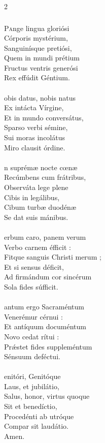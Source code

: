 \documentclass[9pt,twoside]{extarticle}
\begin{document}
\begin{multicols}{2}
{\subsubsection*{\center{}}
\lettrine{P}ange lingua gloriósi\\
Córporis mystérium,\\
Sanguinísque pretiósi,\\
Quem in mundi prétium\\
Fructus ventris generósi\\
Rex effúdit Géntium.\\
\\
obis datus, nobis natus\\
Ex intácta Vírgine,\\
Et in mundo conversátus,\\
Sparso verbi sémine,\\
Sui moras incolátus\\
Miro clausit órdine.\\
\\
n suprémæ nocte cœnæ\\
Recúmbens cum frátribus,\\
Observáta lege plene\\
Cibis in legálibus,\\
Cibum turbæ duodénæ\\
Se dat suis mánibus.\\
\\
erbum caro, panem verum\\
Verbo carnem éfficit :\\
Fitque sanguis Christi merum ;\\
Et si sensus déficit,\\
Ad firmándum cor sincérum\\
Sola fides súfficit.\\
\\
antum ergo Sacraméntum\\
Venerémur cérnui :\\
Et antíquum documéntum\\
Novo cedat rítui :\\
Prǽstet fides suppleméntum\\
Sénsuum deféctui.\\
\\
enitóri, Genitóque\\
Laus, et jubilátio,\\
Salus, honor, virtus quoque\\
Sit et benedíctio,\\
Procedénti ab utróque\\
Compar sit laudátio.\\
Amen.

}
\end{multicols}
\end{document}
